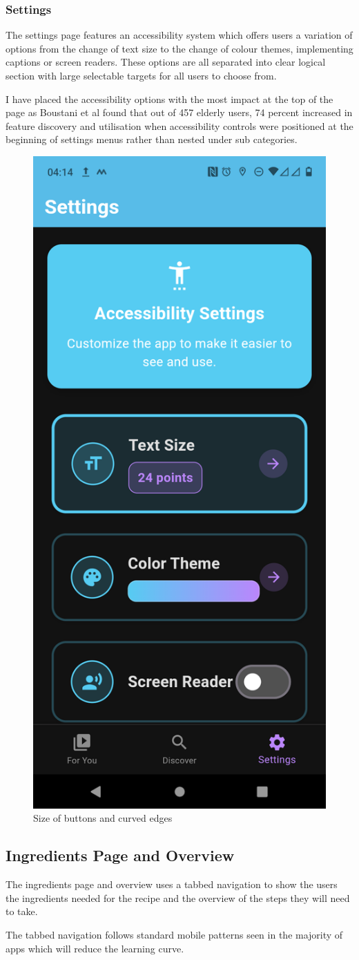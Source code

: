 \documentclass[]{project_final}
\begin{document}
\subsubsection{Settings}
The settings page features an accessibility system which offers users a variation of options from the change of text size to the change of colour themes, implementing captions or screen readers. These options are all separated into clear logical section with large selectable targets for all users to choose from.

I have placed the accessibility options with the most impact at the top of the page as Boustani et al found that out of 457 elderly users, 74 percent increased in feature discovery and utilisation when accessibility controls were positioned at the beginning of settings menus rather than nested under sub categories.

\begin{figure}[ht!]
    \centering
    \includegraphics[height=0.5\textwidth]{mraSetting.png}
    \caption{Size of buttons and curved edges}
    \label{fig:1}
\end{figure}

\subsection{Ingredients Page and Overview}

The ingredients page and overview uses a tabbed navigation to show the users the ingredients needed for the recipe and the overview of the steps they will need to take.

The tabbed navigation follows standard mobile patterns seen in the majority of apps which will reduce the learning curve.
\end{document}

